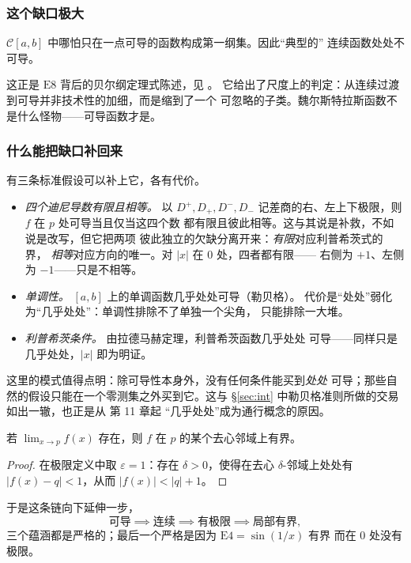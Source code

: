 \subsubsection*{这个缺口极大}

\begin{theorem}\label{thm:baire-gap}
$\mathscr{C}[a,b]$ 中哪怕只在一点可导的函数构成第一纲集。因此“典型的”
连续函数处处不可导。
\end{theorem}

这正是 $\mathrm{E}8$ 背后的贝尔纲定理式陈述，见 \cite[第 28 讲]{yupin}。
它给出了尺度上的判定：从连续过渡到可导并非技术性的加细，而是缩到了一个
可忽略的子类。魏尔斯特拉斯函数不是什么怪物——可导函数才是。

\subsubsection*{什么能把缺口补回来}

有三条标准假设可以补上它，各有代价。

\begin{itemize}[leftmargin=1.6em, itemsep=2.5pt, topsep=4pt]
  \item \emph{四个迪尼导数有限且相等。} 以 $D^{+}, D_{+}, D^{-}, D_{-}$
        记差商的右、左上下极限，则 $f$ 在 $p$ 处可导当且仅当这四个数
        都有限且彼此相等。这与其说是补救，不如说是改写，但它把两项
        彼此独立的欠缺分离开来：\emph{有限}对应利普希茨式的界，
        \emph{相等}对应方向的唯一。对 $|x|$ 在 $0$ 处，四者都有限——
        右侧为 $+1$、左侧为 $-1$——只是不相等。
  \item \emph{单调性。} $[a,b]$ 上的单调函数几乎处处可导（勒贝格）。
        代价是“处处”弱化为“几乎处处”：单调性排除不了单独一个尖角，
        只能排除一大堆。
  \item \emph{利普希茨条件。} 由拉德马赫定理，利普希茨函数几乎处处
        可导——同样只是几乎处处，$|x|$ 即为明证。
\end{itemize}

这里的模式值得点明：除可导性本身外，没有任何条件能买到\emph{处处}
可导；那些自然的假设只能在一个零测集之外买到它。这与 \S\ref{sec:int}
中勒贝格准则所做的交易如出一辙，也正是从 \cite{rudin} 第 11 章起
“几乎处处”成为通行概念的原因。

\begin{proposition}\label{prop:bdd}
若 $\lim_{x\to p}f(x)$ 存在，则 $f$ 在 $p$ 的某个去心邻域上有界。
\end{proposition}

\begin{proof}
在极限定义中取 $\varepsilon=1$：存在 $\delta>0$，使得在去心
$\delta$-邻域上处处有 $|f(x)-q|<1$，从而 $|f(x)|<|q|+1$。
\end{proof}

于是这条链向下延伸一步，
\[ \text{可导} \implies \text{连续} \implies
   \text{有极限} \implies \text{局部有界}, \]
三个蕴涵都是严格的；最后一个严格是因为 $\mathrm{E}4=\sin(1/x)$ 有界
而在 $0$ 处没有极限。
